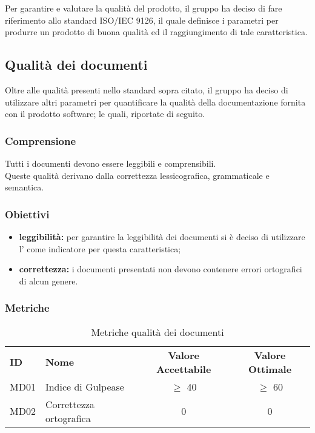 Per garantire e valutare la qualità del prodotto, il gruppo ha deciso di fare riferimento allo standard ISO/IEC 9126, il quale definisce i parametri per produrre un prodotto di buona qualità ed il raggiungimento di tale caratteristica.

\subsection{Qualità dei documenti}
Oltre alle qualità presenti nello standard sopra citato, il gruppo ha deciso di utilizzare altri parametri per quantificare la qualità della documentazione fornita con il prodotto software; le quali, riportate di seguito.

    \subsubsection{Comprensione}
    Tutti i documenti devono essere leggibili e comprensibili.\\
    Queste qualità derivano dalla correttezza lessicografica, grammaticale e semantica.

    \subsubsection{Obiettivi}
    \begin{itemize}
        \item \textbf{leggibilità:} per garantire la leggibilità dei documenti si è deciso di utilizzare l' come indicatore per questa caratteristica;
        \item \textbf{correttezza:} i documenti presentati non devono contenere errori ortografici di alcun genere.
    \end{itemize}

    \subsubsection{Metriche}
    \begin{table} [h!]
    	\begin{center}
    		\begin{tabular} {m{2 cm} m{7 cm} c c }
    			\rowcolor{lightgray}
    			\textbf{ID} & \textbf{Nome}           & \textbf{Valore Accettabile} & \textbf{Valore Ottimale}\\
    			MD01        & Indice di Gulpease      & $\geq$ 40                   & $\geq$ 60\\
    			MD02        & Correttezza ortografica & 0                           & 0
    		\end{tabular}
    	\caption{Metriche qualità dei documenti}
    	\end{center}
    \end{table}

